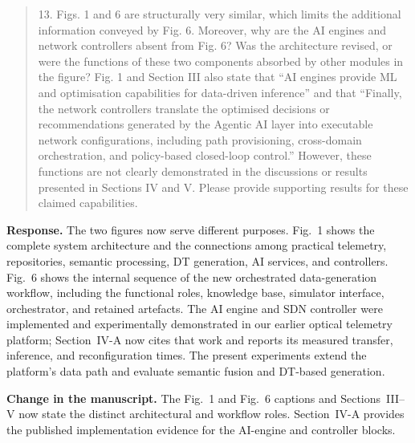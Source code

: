 \documentclass[11pt]{article}
\newenvironment{reviewercomment}{\begin{quote}\color{reviewblue}}{\end{quote}}
\newenvironment{authorresponse}{\color{responsegreen}\textbf{Response.} }{\par\color{black}}
\newcommand{\change}[1]{\par\textbf{Change in the manuscript.} #1\par}
\begin{document}
\begin{reviewercomment}
13. Figs. 1 and 6 are structurally very similar, which limits the additional information conveyed by Fig. 6. Moreover, why are the AI engines and network controllers absent from Fig. 6? Was the architecture revised, or were the functions of these two components absorbed by other modules in the figure? Fig. 1 and Section III also state that ``AI engines provide ML and optimisation capabilities for data-driven inference'' and that ``Finally, the network controllers translate the optimised decisions or recommendations generated by the Agentic AI layer into executable network configurations, including path provisioning, cross-domain orchestration, and policy-based closed-loop control.'' However, these functions are not clearly demonstrated in the discussions or results presented in Sections IV and V. Please provide supporting results for these claimed capabilities.
\end{reviewercomment}
\begin{authorresponse}
The two figures now serve different purposes. Fig.~1 shows the complete system architecture and the connections among practical telemetry, repositories, semantic processing, DT generation, AI services, and controllers. Fig.~6 shows the internal sequence of the new orchestrated data-generation workflow, including the functional roles, knowledge base, simulator interface, orchestrator, and retained artefacts. The AI engine and SDN controller were implemented and experimentally demonstrated in our earlier optical telemetry platform; Section~IV-A now cites that work and reports its measured transfer, inference, and reconfiguration times. The present experiments extend the platform's data path and evaluate semantic fusion and DT-based generation.
\end{authorresponse}
\change{The Fig.~1 and Fig.~6 captions and Sections~III--V now state the distinct architectural and workflow roles. Section~IV-A provides the published implementation evidence for the AI-engine and controller blocks.}
\end{document}

